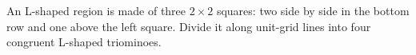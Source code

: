 An L-shaped region is made of three $2\times2$ squares: two side by side in the bottom row and one above the left square. Divide it along unit-grid lines into four congruent L-shaped triominoes.
